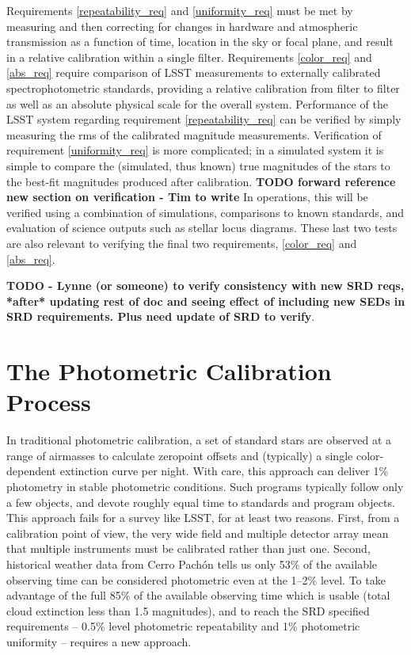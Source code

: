 \documentclass[12pt,preprint]{aastex}
\begin{document}
Requirements \ref{repeatability_req} and \ref{uniformity_req} must be
met by measuring and then correcting for changes in hardware and
atmospheric transmission as a function of time, location in the sky or
focal plane, and result in a relative calibration within a single
filter. Requirements \ref{color_req} and \ref{abs_req} require
comparison of LSST measurements to externally calibrated
spectrophotometric standards, providing a relative calibration from
filter to filter as well as an absolute physical scale for the overall
system.  Performance of the LSST system regarding requirement
\ref{repeatability_req} can be verified by simply measuring the rms of
the calibrated magnitude measurements. Verification of requirement
\ref{uniformity_req} is more complicated; in a simulated system it is
simple to compare the (simulated, thus known) true magnitudes of the
stars to the best-fit magnitudes produced after calibration. {\bf TODO forward reference new section on verification - Tim to write} 
In operations, this will be verified using a combination of simulations,
comparisons to known standards, and evaluation of science outputs such
as stellar locus diagrams. These last two tests are also relevant to
verifying the final two requirements, \ref{color_req} and
\ref{abs_req}.

{\bf TODO - Lynne (or someone) to verify consistency with new SRD reqs, *after* updating rest of doc and seeing effect of including new SEDs in SRD requirements. Plus need update of SRD to verify}. 


\section{The Photometric Calibration Process}
\label{sec:calib_overview}

In traditional photometric calibration, a set of standard stars are
observed at a range of airmasses to calculate zeropoint offsets and
(typically) a single color-dependent extinction curve per night. With care,
this approach can deliver 1\% photometry in stable photometric conditions.
Such programs typically follow only a few objects, and devote roughly equal
time to standards and program objects.   This approach fails for a survey like
LSST, for at least two reasons.  First, from a calibration point of view, 
the very wide field and multiple detector array mean that multiple instruments must be
calibrated rather than just one.
Second, historical weather data from Cerro Pach\'{o}n tells us
only 53\% of the available observing time can be considered
photometric even at the 1--2\% level. To take advantage of the full
85\% of the available observing time which is usable (total cloud
extinction less than 1.5 magnitudes), and to reach the SRD specified
requirements -- 0.5\% level photometric repeatability and 1\%
photometric uniformity -- requires a new approach.
\end{document}
